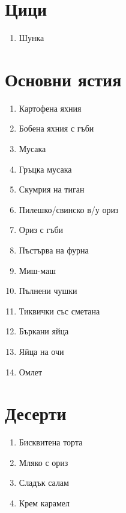\documentclass{article}
\begin{document}
\section{Цици}
\begin{enumerate}
    \item{Шунка}
\end{enumerate}

\section{Основни ястия}
\begin{enumerate}
    \item{Картофена яхния}
    \item{Бобена яхния с гъби}
    \item{Мусака}
    \item{Гръцка мусака}
    \item{Скумрия на тиган}
    \item{Пилешко/свинско в/у ориз}
    \item{Ориз с гъби}
    \item{Пъстърва на фурна}
    \item{Миш-маш}
    \item{Пълнени чушки}
    \item{Тиквички със сметана}
    \item{Бъркани яйца}
    \item{Яйца на очи}
    \item{Омлет}
\end{enumerate}

\section{Десерти}
\begin{enumerate}
    \item{Бисквитена торта}
    \item{Мляко с ориз}
    \item{Сладък салам}
    \item{Крем карамел}
\end{enumerate}
\end{document}
